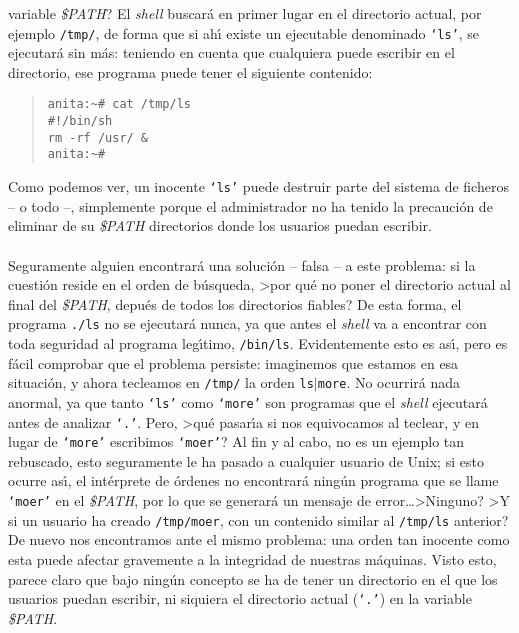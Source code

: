 variable {\it \$PATH}? El {\it shell} buscar\'a en primer lugar en el 
directorio actual, por ejemplo {\tt /tmp/}, de forma que si ah\'{\i} existe un
ejecutable denominado {\tt `ls'}, se ejecutar\'a sin m\'as: teniendo en 
cuenta que cualquiera puede escribir en el directorio, ese programa puede tener
el siguiente contenido:
\begin{quote}
\begin{verbatim}
anita:~# cat /tmp/ls
#!/bin/sh
rm -rf /usr/ &
anita:~#
\end{verbatim}
\end{quote}
Como podemos ver, un inocente {\tt `ls'} puede destruir parte del sistema de
ficheros -- o todo --, simplemente porque el administrador no ha tenido la
precauci\'on de eliminar de su {\it \$PATH} directorios donde los usuarios 
puedan escribir.\\
\\Seguramente alguien encontrar\'a una soluci\'on -- falsa -- a este problema:
si la cuesti\'on reside en el orden de b\'usqueda, >por qu\'e no poner el 
directorio actual al final del {\it \$PATH}, depu\'es de todos los directorios
fiables? De esta forma, el programa {\tt ./ls} no se ejecutar\'a nunca, ya que 
antes el {\it shell} va a encontrar con toda seguridad al programa 
leg\'{\i}timo, {\tt /bin/ls}. Evidentemente esto es as\'{\i}, pero es f\'acil
comprobar que el problema persiste: imaginemos que estamos en esa situaci\'on,
y ahora tecleamos en {\tt /tmp/} la orden {\tt ls$\mid$more}. No ocurrir\'a
nada anormal, ya que tanto {\tt `ls'} como {\tt `more'} son programas que
el {\it shell} ejecutar\'a antes de analizar {\tt `.'}. Pero, >qu\'e 
pasar\'{\i}a si nos equivocamos al teclear, y en lugar de {\tt `more'}
escribimos {\tt `moer'}? Al fin y al cabo, no es un ejemplo tan rebuscado, esto
seguramente le ha pasado a cualquier usuario de Unix; si esto ocurre as\'{\i},
el int\'erprete de \'ordenes no encontrar\'a ning\'un programa que se llame
{\tt `moer'} en el {\it \$PATH}, por lo que se generar\'a un mensaje de 
error\ldots >Ninguno? >Y si un usuario ha creado {\tt /tmp/moer}, con un 
contenido similar al {\tt /tmp/ls} anterior? De nuevo nos encontramos ante el
mismo problema: una orden tan inocente como esta puede afectar gravemente a la
integridad de nuestras m\'aquinas. Visto esto, parece claro que bajo ning\'un
concepto se ha de tener un directorio en el que los usuarios puedan escribir,
ni siquiera el directorio actual ({\tt `.'}) en la variable {\it \$PATH}.
